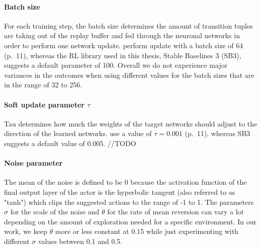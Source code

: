 \paragraph{Batch size} For each training step, the batch size determines the amount of transition tuples are taking out of the replay buffer and fed through the neuronal networks in order to perform one network update. \cite{lillicrap2019continuous} perform update with a batch size of 64 (p.~11), whereas the RL library used in this thesis, Stable Baselines 3 (SB3), suggests a default parameter of 100. Overall we do not experience major variances in the outcomes when using different values for the batch sizes that are in the range of 32 to 256. 

\paragraph{Soft update parameter $\tau$} Tau determines how much the weights of the target networks should adjust to the direction of the learned networks. \cite{lillicrap2019continuous} use a value of $\tau = 0.001$ (p.~11), whereas SB3 suggests a default value of 0.005. //TODO

\paragraph{Noise parameter} The mean of the noise is defined to be 0 because the activation function of the final output layer of the actor is the hyperbolic tangent (also referred to as "tanh") which clips the suggested actions to the range of -1 to 1. The parameters $\sigma$ for the scale of the noise and $\theta$ for the rate of mean reversion can vary a lot depending on the amount of exploration needed for a specific environment. In our work, we keep $\theta$ more or less constant at 0.15 while just experimenting with different $\sigma$ values between 0.1 and 0.5. 